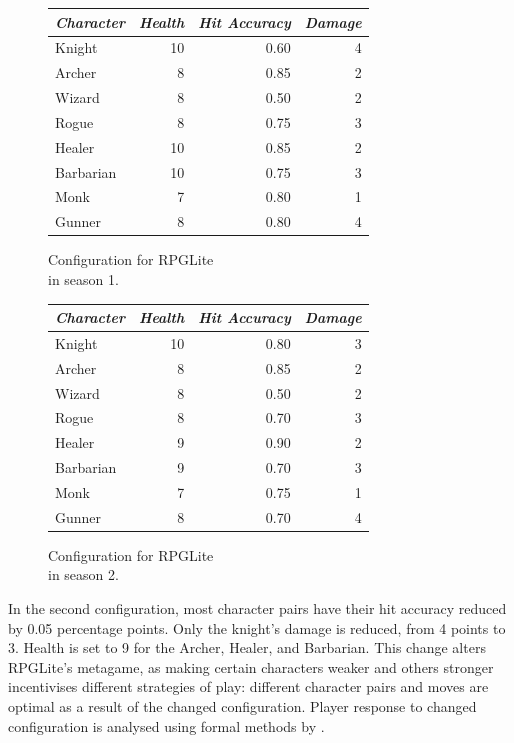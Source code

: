 \begin{figure}[h]
  \begin{minipage}{.50\columnwidth}
    \centering
    \begin{tabular}{@{}l r r r@{}}
      \toprule
      \emph{Character} & \emph{Health} & \emph{Hit Accuracy} & \emph{Damage}\\
      \midrule
      Knight & 10 & 0.60 & 4 \\
      Archer & 8 & 0.85 & 2 \\
      Wizard & 8 & 0.50 & 2 \\
      Rogue & 8 & 0.75 & 3 \\
      Healer & 10 & 0.85 & 2 \\
      Barbarian & 10 & 0.75 & 3 \\
      Monk & 7 & 0.80 & 1 \\
      Gunner & 8 & 0.80 & 4 \\
      \bottomrule
    \end{tabular}
    \caption{Configuration for RPGLite\\in season 1.}
    \label{fig:s1_config}
  \end{minipage}%
  \begin{minipage}{.50\columnwidth}
    \centering
    \begin{tabular}{@{}l r r r@{}}
      \toprule
      \emph{Character} & \emph{Health} & \emph{Hit Accuracy} & \emph{Damage}\\
      \midrule
      Knight & 10 & 0.80 & 3 \\
      Archer & 8 & 0.85 & 2 \\
      Wizard & 8 & 0.50 & 2 \\
      Rogue & 8 & 0.70 & 3 \\
      Healer & 9 & 0.90 & 2 \\
      Barbarian & 9 & 0.70 & 3 \\
      Monk & 7 & 0.75 & 1 \\
      Gunner & 8 & 0.70 & 4 \\
      \bottomrule
    \end{tabular}
    \caption{Configuration for RPGLite\\in season 2.}
    \label{fig:s2_config}
  \end{minipage}
\label{fig:table_of_char_params_between_seasons}
\end{figure}

In the second configuration, most character pairs have their hit accuracy
reduced by 0.05 percentage points. Only the knight's damage is reduced, from 4
points to 3. Health is set to 9 for the Archer, Healer, and Barbarian. This
change alters RPGLite's metagame, as making certain characters weaker and others
stronger incentivises different strategies of play: different character pairs
and moves are optimal as a result of the changed configuration. Player response
to changed configuration is analysed using formal methods by
\citet{kavanagh2021thesis}.


